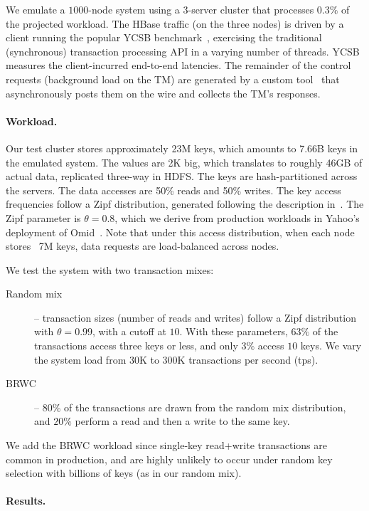 We emulate a $1000$-node system using a $3$-server cluster that processes $0.3\%$ of the projected workload. 
The HBase traffic (on the three nodes) is driven by a client running the popular YCSB benchmark~\cite{Cooper:2010:BCS:1807128.1807152}, 
exercising the traditional (synchronous) transaction processing API in a varying number of threads. YCSB measures the client-incurred end-to-end latencies.
The remainder of the control requests (background load on the TM) are generated by a custom tool~\cite{Omid2017} 
that asynchronously posts them on the wire and collects the TM's responses. 

\paragraph{Workload.}

Our test cluster stores approximately 23M keys, which amounts to 7.66B keys in the emulated system. 
The values are 2K big, which translates to roughly 46GB of actual data, replicated three-way in HDFS. The keys are hash-partitioned
across the servers. The data accesses are 50\% reads and 
50\% writes. The key access frequencies follow a Zipf distribution, generated following 
the description in~\cite{Gray:1994:QGB:191839.191886}. The Zipf parameter is $\theta=0.8$, which we derive from production 
workloads in Yahoo's deployment of Omid~\cite{Omid2017}. 
Note that under this access distribution, when each node stores ~7M keys, data requests are load-balanced across nodes.

We test the system with two transaction mixes:
\begin{description}
\item[Random mix] -- 
transaction sizes (number of reads and writes) follow a Zipf distribution with $\theta=0.99$, with a cutoff at $10$. 
With these parameters, $63\%$ of the transactions access three keys or less, and only $3\%$ access $10$ keys. 
We vary the system load from 30K to 300K transactions per second (tps). 
\item[BRWC] -- $80\%$ of the transactions are drawn from the random mix distribution, and $20\%$ perform a read
and then a write to the same key. 
\end{description}

We add the BRWC workload since single-key read+write transactions are common in production, and are highly unlikely to 
occur under random key selection with billions of keys (as in our random mix).

\paragraph{Results.} 


